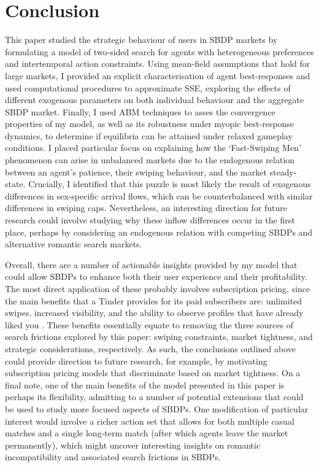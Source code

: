 \section{Conclusion}
\label{sec:section5}
This paper studied the strategic behaviour of users in SBDP markets by formulating a model of two-sided search for agents with heterogeneous preferences and intertemporal action constraints. 
Using mean-field assumptions that hold for large markets, I provided an explicit characterisation of agent best-responses and used computational procedures to approximate SSE, exploring the effects of different exogenous parameters on both individual behaviour and the aggregate SBDP market.
Finally, I used ABM techniques to asses the convergence properties of my model, as well as its robustness under myopic best-response dynamics, to determine if equilibria can be attained under relaxed gameplay conditions.
I placed particular focus on explaining how the `Fast-Swiping Men' phenomenon can arise in unbalanced markets due to the endogenous relation between an agent's patience, their swiping behaviour, and the market steady-state. 
Crucially, I identified that this puzzle is most likely the result of exogenous differences in sex-specific arrival flows, which can be counterbalanced with similar differences in swiping caps. Nevertheless, an interesting direction for future research could involve studying why these inflow differences occur in the first place, perhaps by considering an endogenous relation with competing SBDPs and alternative romantic search markets. 

Overall, there are a number of actionable insights provided by my model that could allow SBDPs to enhance both their user experience and their profitability.
The most direct application of these probably involves subscription pricing, since the main benefits that a Tinder provides for its paid subscribers are: unlimited swipes, increased visibility, and the ability to observe profiles that have already liked you \citep{web:tinder_subscription}.
These benefits essentially equate to removing the three sources of search frictions explored by this paper: swiping constraints, market tightness, and strategic considerations, respectively.
As such, the conclusions outlined above could provide direction to future research, for example, by motivating subscription pricing models that discriminate based on market tightness.
On a final note, one of the main benefits of the model presented in this paper is perhaps its flexibility, admitting to a number of potential extensions that could be used to study more focused aspects of SBDPs. 
One modification of particular interest would involve a richer action set that allows for both multiple casual matches and a single long-term match (after which agents leave the market permanently), which might uncover interesting insights on romantic incompatibility and associated search frictions in SBDPs.